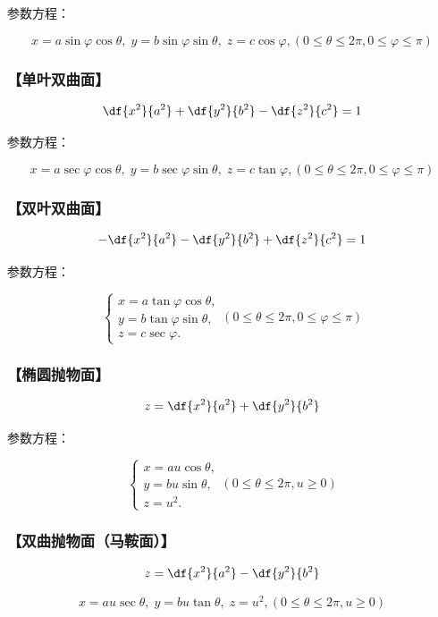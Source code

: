 参数方程：

$${x=a\sin\varphi\cos\theta,\;y=b\sin\varphi\sin\theta,\;z=c\cos\varphi},
{(0\leq\theta\leq
2\pi,0\leq\varphi\leq\pi)}$$

\subsubsection{【单叶双曲面】}

$${\df{x^2}{a^2}+\df{y^2}{b^2}-\df{z^2}{c^2}=1}$$

参数方程：

$$x=a\sec\varphi\cos\theta,\;y=b\sec\varphi\sin\theta,\;z=c\tan\varphi,
(0\leq\theta\leq 2\pi,0\leq\varphi\leq\pi)$$

\subsubsection{【双叶双曲面】}

$${-\df{x^2}{a^2}-\df{y^2}{b^2}+\df{z^2}{c^2}=1}$$

参数方程：

$$\left\{\begin{array}{l}
	x=a\tan\varphi\cos\theta,\\
	y=b\tan\varphi\sin\theta,\\
	z=c\sec\varphi.
\end{array}\right.(0\leq\theta\leq 2\pi,0\leq\varphi\leq\pi)$$

\subsubsection{【椭圆抛物面】}

$${z=\df{x^2}{a^2}+\df{y^2}{b^2}}$$

参数方程：

$$\left\{\begin{array}{l}
	x=au\cos\theta,\\
	y=bu\sin\theta,\\
	z=u^2.
\end{array}\right.(0\leq\theta\leq 2\pi,u\geq 0)$$

\subsubsection{【双曲抛物面（马鞍面）】}

$${z=\df{x^2}{a^2}-\df{y^2}{b^2}}$$

$$x=au\sec\theta,\;y=bu\tan\theta,\;z=u^2,
(0\leq\theta\leq 2\pi,u\geq
0)$$

